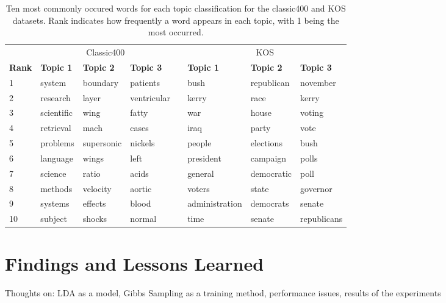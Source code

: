 \documentclass[10pt]{article}
\newcommand{\ra}[1]{\renewcommand{\arraystretch}{#1}}
\begin{document}
\begin{table}[t]
	\centering
    \ra{1.2}
	\begin{tabular}{@{} l l l l c l l l @{}}
        \toprule
        & \multicolumn{3}{c}{Classic400} & \phantom{abc} & \multicolumn{3}{c}{KOS}\\
        \cmidrule{2-4} \cmidrule{6-8}
        \bf{Rank} & \bf{Topic 1} & \bf{Topic 2} & \bf{Topic 3} && \bf{Topic 1} & \bf{Topic 2} & \bf{Topic 3} \\
        \midrule
         1 & system     & boundary      & patients      && bush             & republican    & november \\
         2 & research   & layer         & ventricular   && kerry            & race          & kerry \\
         3 & scientific & wing          & fatty         && war              & house         & voting \\
         4 & retrieval  & mach          & cases         && iraq             & party         & vote \\
         5 & problems   & supersonic    & nickels       && people           & elections     & bush \\
         6 & language   & wings         & left          && president        & campaign      & polls \\
         7 & science    & ratio         & acids         && general          & democratic    & poll \\
         8 & methods    & velocity      & aortic        && voters           & state         & governor \\ 
         9 & systems    & effects       & blood         && administration   & democrats     & senate \\
        10 & subject    & shocks        & normal        && time             & senate        & republicans \\
        \bottomrule
	\end{tabular}
	\caption{Ten most commonly occured words for each topic classification for the classic400 and KOS datasets. Rank indicates how frequently a word appears in each topic, with 1 being the most occurred.}
	\label{tab:most_common}
\end{table}



\section{Findings and Lessons Learned}
\label{sec:conclusion}

Thoughts on: LDA as a model, Gibbs Sampling as a training method, performance issues, results of the experiments




\end{document}
